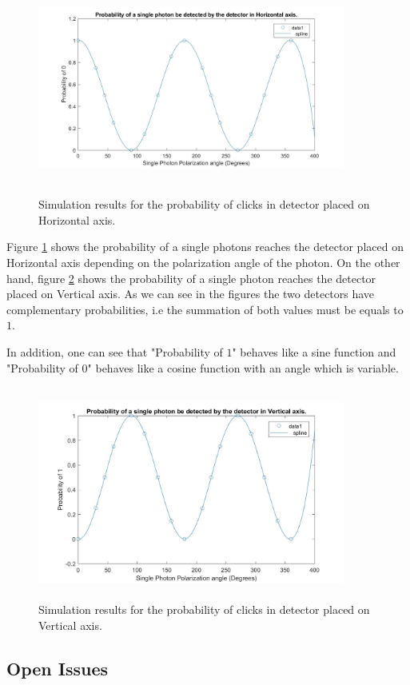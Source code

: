 \begin{figure}[H]
	\centering
	\includegraphics[width=0.9\textwidth, height=7cm]{./sdf/qrng/figures_raw/probx.jpg}
	\caption{Simulation results for the probability of clicks in detector placed on Horizontal axis.}\label{probx}
\end{figure}
Figure \ref{probx} shows the probability of a single photons reaches the detector placed on Horizontal axis depending on the polarization angle of the photon. On the other hand, figure \ref{proby} shows the probability of a single photon reaches the detector placed on Vertical axis. As we can see in the figures the two detectors have complementary probabilities, i.e the summation of both values must be equals to $1$.

In addition, one can see that "Probability of $1$" \space behaves like a sine function and "Probability of 0" \space behaves like a cosine function with an angle which is variable.


\begin{figure}[h]
	\centering
	\includegraphics[width=0.9\textwidth, height=7cm]{./sdf/qrng/figures_raw/proby.jpg}
	\caption{Simulation results for the probability of clicks in detector placed on Vertical axis.}\label{proby}
\end{figure}

\subsection{Open Issues}


\newpage




\cleardoublepage
